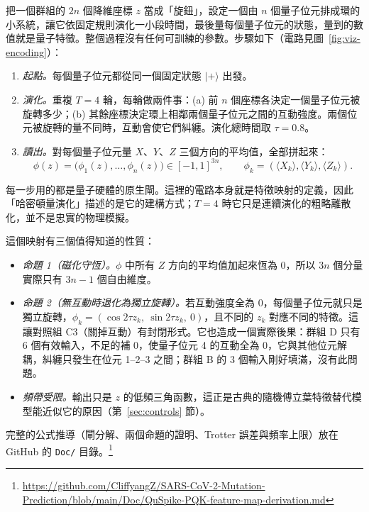 \documentclass[10pt,a4paper]{article}
\begin{document}
把一個群組的 $2n$ 個降維座標 $z$ 當成「旋鈕」，設定一個由 $n$ 個量子位元排成環的小系統，讓它依固定規則演化一小段時間，最後量每個量子位元的狀態，量到的數值就是量子特徵。整個過程沒有任何可訓練的參數。步驟如下（電路見圖~\ref{fig:viz-encoding}）：
\begin{enumerate}
    \item \textit{起點。}每個量子位元都從同一個固定狀態 $|{+}\rangle$ 出發。
    \item \textit{演化。}重複 $T=4$ 輪，每輪做兩件事：(a) 前 $n$ 個座標各決定一個量子位元被旋轉多少；(b) 其餘座標決定環上相鄰兩個量子位元之間的互動強度。兩個位元被旋轉的量不同時，互動會使它們糾纏。演化總時間取 $\tau=0.8$。
    \item \textit{讀出。}對每個量子位元量 $X$、$Y$、$Z$ 三個方向的平均值，全部拼起來：
    \begin{equation}
        \phi(z)=\big(\phi_1(z),\dots,\phi_n(z)\big)\in[-1,1]^{3n},\qquad
        \phi_k=(\langle X_k\rangle,\langle Y_k\rangle,\langle Z_k\rangle).
        \label{eq:readout}
    \end{equation}
\end{enumerate}
每一步用的都是量子硬體的原生閘。這裡的電路本身就是特徵映射的定義，因此「哈密頓量演化」描述的是它的建構方式；$T=4$ 時它只是連續演化的粗略離散化，並不是忠實的物理模擬。

這個映射有三個值得知道的性質：
\begin{itemize}
    \item \textit{命題 1（磁化守恆）。}$\phi$ 中所有 $Z$ 方向的平均值加起來恆為 0，所以 $3n$ 個分量實際只有 $3n-1$ 個自由維度。
    \item \textit{命題 2（無互動時退化為獨立旋轉）。}若互動強度全為 0，每個量子位元就只是獨立旋轉，$\phi_k=(\cos2\tau z_k,\allowbreak\ \sin2\tau z_k,\allowbreak\ 0)$，且不同的 $z_k$ 對應不同的特徵。這讓對照組 C3（關掉互動）有封閉形式。它也造成一個實際後果：群組 D 只有 6 個有效輸入，不足的補 0，使量子位元 4 的互動全為 0，它與其他位元解耦，糾纏只發生在位元 1--2--3 之間；群組 B 的 3 個輸入剛好填滿，沒有此問題。
    \item \textit{頻帶受限。}輸出只是 $z$ 的低頻三角函數，這正是古典的隨機傅立葉特徵替代模型能近似它的原因（第~\ref{sec:controls} 節）。
\end{itemize}
完整的公式推導（閘分解、兩個命題的證明、Trotter 誤差與頻率上限）放在 GitHub 的 \texttt{Doc/} 目錄。\footnote{\url{https://github.com/CliffyangZ/SARS-CoV-2-Mutation-Prediction/blob/main/Doc/QuSpike-PQK-feature-map-derivation.md}}
\end{document}
